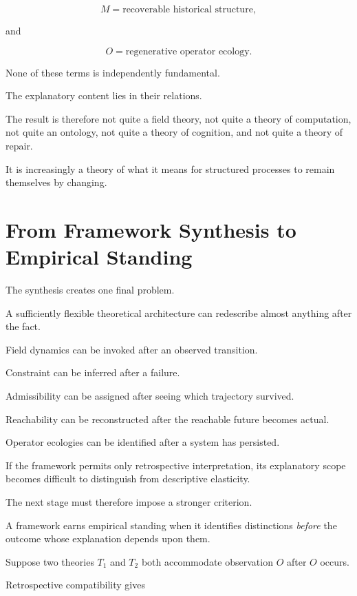 \documentclass[11pt]{article}
\theoremstyle{remark}
\begin{document}
\begin{equation}
M
=
\text{recoverable historical structure},
\end{equation}

and

\begin{equation}
O
=
\text{regenerative operator ecology}.
\end{equation}

None of these terms is independently fundamental.

The explanatory content lies in their relations.

The result is therefore not quite a field theory, not quite a theory of computation, not quite an ontology, not quite a theory of cognition, and not quite a theory of repair.

It is increasingly a theory of what it means for structured processes to remain themselves by changing.

\section{From Framework Synthesis to Empirical Standing}

The synthesis creates one final problem.

A sufficiently flexible theoretical architecture can redescribe almost anything after the fact.

Field dynamics can be invoked after an observed transition.

Constraint can be inferred after a failure.

Admissibility can be assigned after seeing which trajectory survived.

Reachability can be reconstructed after the reachable future becomes actual.

Operator ecologies can be identified after a system has persisted.

If the framework permits only retrospective interpretation, its explanatory scope becomes difficult to distinguish from descriptive elasticity.

The next stage must therefore impose a stronger criterion.

A framework earns empirical standing when it identifies distinctions \emph{before} the outcome whose explanation depends upon them.

Suppose two theories $T_1$ and $T_2$ both accommodate observation $O$ after $O$ occurs.

Retrospective compatibility gives
\end{document}
